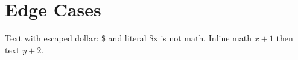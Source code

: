 \section{Edge Cases}
Text with escaped dollar: \$ and literal \$x is not math.
Inline math $x+1$ then text $y+2$.
